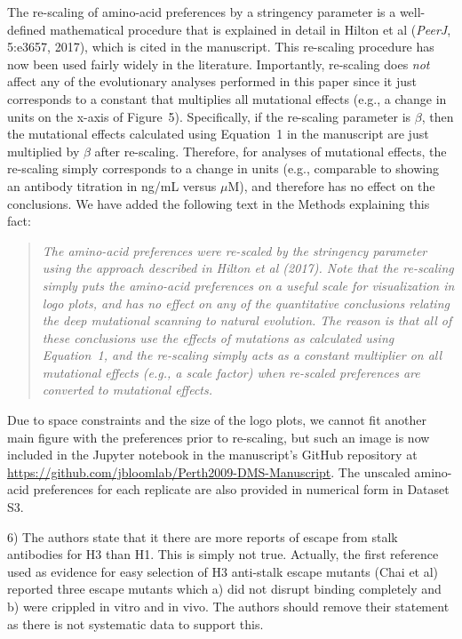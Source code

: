 \documentclass[11pt, oneside]{article}   	%
\newcommand{\response}[1]{{\color{black}#1}}
\begin{document}
\response{
The re-scaling of amino-acid preferences by a stringency parameter is a well-defined mathematical procedure that is explained in detail in Hilton et al (\textit{PeerJ}, 5:e3657, 2017), which is cited in the manuscript.
This re-scaling procedure has now been used fairly widely in the literature. 
Importantly, re-scaling does \emph{not} affect any of the evolutionary analyses performed in this paper since it just corresponds to a constant that multiplies all mutational effects (e.g., a change in units on the x-axis of Figure~5).
Specifically, if the re-scaling parameter is $\beta$, then the mutational effects calculated using Equation~1 in the manuscript are just multiplied by $\beta$ after re-scaling.
Therefore, for analyses of mutational effects, the re-scaling simply corresponds to a change in units (e.g., comparable to showing an antibody titration in ng/mL versus $\mu$M), and therefore has no effect on the conclusions.
We have added the following text in the Methods explaining this fact:

\begin{quote}
\textsl{The amino-acid preferences were re-scaled by the stringency parameter using the approach described in Hilton et al (2017).
Note that the re-scaling simply puts the amino-acid preferences on a useful scale for visualization in logo plots, and has no effect on any of the quantitative conclusions relating the deep mutational scanning to natural evolution.
The reason is that all of these conclusions use the effects of mutations as calculated using Equation~1, and the re-scaling simply acts as a constant multiplier on all mutational effects (e.g., a scale factor) when re-scaled preferences are converted to mutational effects.}
\end{quote}

Due to space constraints and the size of the logo plots, we cannot fit another main figure with the preferences prior to re-scaling, but such an image is now included in the Jupyter notebook in the manuscript's GitHub repository at \url{https://github.com/jbloomlab/Perth2009-DMS-Manuscript}.
The unscaled amino-acid preferences for each replicate are also provided in numerical form in Dataset S3.
}

6) The authors state that it there are more reports of escape from stalk antibodies for H3 than H1. This is simply not true. Actually, the first reference used as evidence for easy selection of H3 anti-stalk escape mutants (Chai et al) reported three escape mutants which a) did not disrupt binding completely and b) were crippled in vitro and in vivo. The authors should remove their statement as there is not systematic data to support this. 
\end{document}
